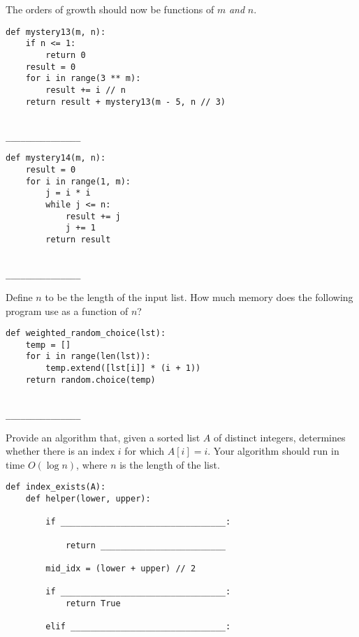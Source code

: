 \documentclass[twoside]{article}
\begin{document}
\begin{enumerate}

The orders of growth should now be functions of $m$ \emph{and} $n$.

\begin{lstlisting}
def mystery13(m, n):
    if n <= 1:
        return 0
    result = 0
    for i in range(3 ** m):
        result += i // n
    return result + mystery13(m - 5, n // 3)
\end{lstlisting}
~\\
\lstinline{_______________}

\begin{lstlisting}
def mystery14(m, n):
    result = 0
    for i in range(1, m):
        j = i * i
        while j <= n:
            result += j
            j += 1
        return result
\end{lstlisting}
~\\
\lstinline{_______________}

\newpage


Define $n$ to be the length of the input list. How much memory does the following program use as a function of $n$?

\begin{lstlisting}
def weighted_random_choice(lst):
	temp = []
	for i in range(len(lst)):
		temp.extend([lst[i]] * (i + 1))
	return random.choice(temp)
\end{lstlisting}
~\\
\lstinline{_______________}


Provide an algorithm that, given a sorted list $A$ of distinct integers, determines whether there is an index $i$ for which $A[i] = i$. Your algorithm should run in time $O(\log{n})$, where $n$ is the length of the list.

\begin{lstlisting}
def index_exists(A):
    def helper(lower, upper):
    
        if _________________________________:
        
            return _________________________
            
        mid_idx = (lower + upper) // 2
        
        if _________________________________:
            return True
            
        elif _______________________________:
        

\end{lstlisting}
\end{enumerate}
\end{document}
